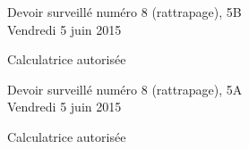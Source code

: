 \documentclass[a4paper,10pt]{article}
\begin{document}







\begin{feuilleDS}{Devoir surveillé numéro 8 (rattrapage), 5B\\ \small Vendredi  5 juin 2015}
    \begin{center}
        Calculatrice autorisée
    \end{center}
\vspace{1cm}

\end{feuilleDS}


\begin{feuilleDS}{Devoir surveillé numéro 8 (rattrapage), 5A\\ \small Vendredi  5 juin 2015}
    \begin{center}
        Calculatrice autorisée
    \end{center}
\vspace{1cm}


\end{feuilleDS}
\end{document}
